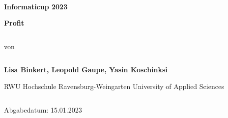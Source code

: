 
\begin{verbatim}
\end{verbatim}

\begin{verbatim}
	
\end{verbatim}
\begin{center}
	\textbf{Informaticup 2023}
\end{center}
\begin{center}
	\large{\textbf{Profit}}
\end{center}

\begin{verbatim}
\end{verbatim}
\begin{center}
	von
	\begin{verbatim}
	\end{verbatim}
	\large \textbf{Lisa Binkert, Leopold Gaupe, Yasin Koschinksi}
\end{center}
\begin{center}

	RWU Hochschule Ravensburg-Weingarten University of Applied Sciences
\end{center}

\begin{verbatim}
\end{verbatim}
\begin{center}
	Abgabedatum: 15.01.2023
\end{center}
\begin{verbatim}
	
	
	
\end{verbatim}	
